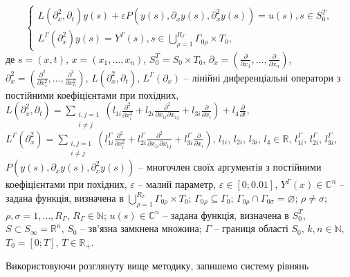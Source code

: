 \begin{equation}
    \label{eq:small_parameter_common_system_with_conditions}
    \left\{
    \begin{alignedat}{2}
        L(\partial_x^2, \partial_t)y(s) + \varepsilon P(y(s), \partial_x y(s), \partial_x^2 y(s)) = u(s), s\in S_{0}^T, \\
        L^{\Gamma}(\partial^{2}_{x})y(s) = Y^{\Gamma}(s),s\in\bigcup\limits_{\rho=1}^{R_{\Gamma}} \Gamma_{0\rho}\times T_{0},
    \end{alignedat}
    \right.
\end{equation}
де $s=(x,t)$, $x=(x_{1},\dots,x_{n})$, $S_{0}^{T}=S_{0}\times T_{0}$, $\partial_{x}=\left(
\frac{\partial}{\partial x_{1}}, \dots, \frac{\partial}{\partial x_{n}} \right)$,
$\partial^{2}_{x}=\left(\frac{\partial^{2}}{\partial x^{2}_{1}}, \dots, \frac{\partial^{2}}{\partial x^{2}_{n}} \right)$,
$L(\partial_x^2, \partial_t)$, $L^{\Gamma}(\partial_{x})$ -- лінійні диференціальні оператори з постійними коефіцієнтами при похідних,
$
L(\partial_x^2, \partial_t)=\sum\limits_{ \substack{i,j=1\\ i\neq j}}\left(l_{1i} \frac{\partial^2}{\partial x^2_i} +
l_{2i}\frac{\partial^2}{\partial x_{1i}
    \partial x_{1j}} + l_{3i} \frac{\partial}{\partial x_i} \right) + l_4 \frac{\partial}{\partial t}
$,
$
L^{\Gamma}(\partial_x^2)=\sum\limits_{ \substack{i,j=1\\ i\neq j}}\left(l^{\Gamma}_{1i} \frac{\partial^2}{\partial x^2_i} +
l^{\Gamma}_{2i}\frac{\partial^2}{\partial x_{1i}
    \partial x_{1j}} + l^{\Gamma}_{3i} \frac{\partial}{\partial x_i} \right)
$,
$l_{1i}$, $l_{2i}$, $l_{3i}$, $l_{4}\in\mathbb{R}$,
$l^{\Gamma}_{1i}$, $l^{\Gamma}_{2i}$, $l^{\Gamma}_{3i}$,
$P(y(s), \partial_x y(s), \partial_x^2 y(s))$ -- многочлен  своїх аргументів з постійними
коефіцієнтами при похідних,  $\varepsilon$ – малий параметр, $\varepsilon\in [0; 0.01]$,
$Y^{\Gamma}(x)\in\mathbb{C}^n$ -- задана функція, визначена в
$\bigcup\limits_{\rho=1}^{R_{\Gamma}}\Gamma_{0\rho}\times T_{0}$;
$\Gamma_{0\rho}\subseteq \Gamma_{0}$; $\Gamma_{0\rho}\cap\Gamma_{0\sigma} = \varnothing$;
$\rho\neq\sigma$; $\rho,\sigma = 1,\dots,R_{\Gamma}$, $R_{\Gamma}\in\mathbb{N}$; $u(s)\in\mathbb{C}^n$ --
задана функція, визначена в $S_{0}^{T}$, $S\subset S_{\infty}=\mathbb{R}^{n}$,
$S_{0}$ -- зв'язна замкнена множина; $\Gamma$ -- границя області $S_{0}$, $k,n\in\mathbb{N}$, $T_{0}=[0;T]$,
$T\in\mathbb{R}_{+}$.

Використовуючи розглянуту вище методику, запишемо систему рівнянь

